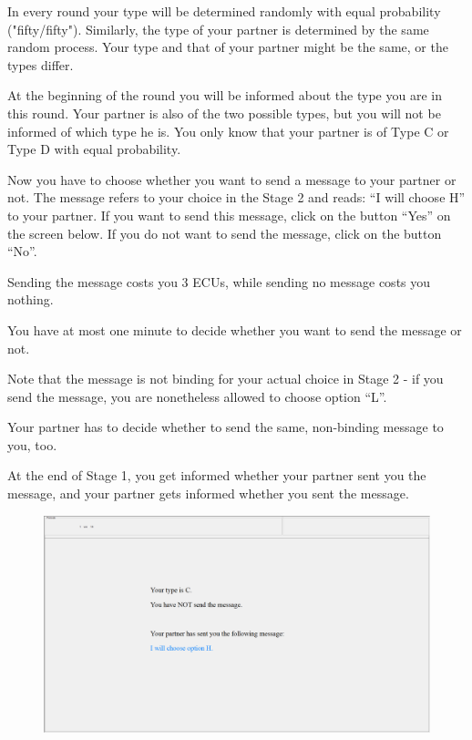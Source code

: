 \documentclass[12pt]{article}
\theoremstyle{break}
\begin{document}
In every round your type will be determined randomly with equal probability ("fifty/fifty"). Similarly, the type of your partner is determined by the same random process. Your type and that of your partner might be the same, or the types differ.

At the beginning of the round you will be informed about the type you are in this round. Your partner is also of the two possible types, but you will not be informed of which type he is. You only know that your partner is of Type C or Type D with equal probability.

Now you have to choose whether you want to send a message to your partner or not. The message refers to your choice in the Stage 2 and reads: “I will choose H” to your partner. If you want to send this message, click on the button ``Yes'' on the screen below. If you do not want to send the message, click on the button ``No''. 

Sending the message costs you 3 ECUs, while sending no message costs you nothing.

You have at most one minute to decide whether you want to send the message or not. 

Note that the message is not binding for your actual choice in Stage 2 - if you send the message, you are nonetheless allowed to choose option ``L''.

Your partner has to decide whether to send the same, non-binding message to you, too.

At the end of Stage 1, you get informed whether your partner sent you the message, and your partner gets informed whether you sent the message. 

\begin{figure}[h]
  \centering
    \includegraphics[width=.9\textwidth]{fig2-CT-instructions.png}
\label{fig:fig2-CT-instructions}
\end{figure}
\end{document}
